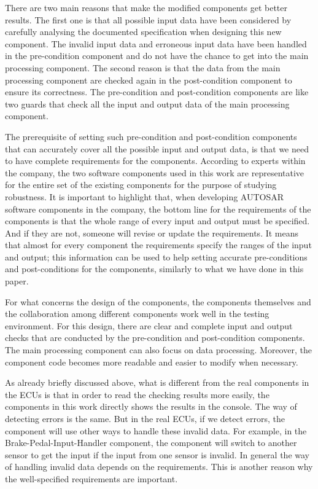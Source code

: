 There are two main reasons that make the modified components get better results. The first one is that all possible input data have been considered by carefully analysing the documented specification when designing this new component. The invalid input data and erroneous input data have been handled in the pre-condition component and do not have the chance to get into the main processing component. The second reason is that the data from the main processing component are checked again in the post-condition component to ensure its correctness. The pre-condition and post-condition components are like two guards that check all the input and output data of the main processing component. 

The prerequisite of setting such pre-condition and post-condition components that can accurately cover all the possible input and output data, is that we need to have complete requirements for the components. 
According to experts within the company, %
the two software components used in this work are representative for the entire set of the existing components for the purpose of studying robustness. It is important to highlight that, when developing AUTOSAR software components in the company, the bottom line for the requirements of the components is that the whole range of every input and output must be specified. And if they are not, someone will revise or update the requirements. It means that almost for every component the requirements specify the ranges of the input and output; this information can be used to help setting accurate pre-conditions and post-conditions for the components, similarly to what we have done in this paper.

For what concerns the design of the components, the components themselves and the collaboration among different components work well in the testing environment. For this design, there are clear and complete input and output checks that are conducted by the pre-condition and post-condition components. The main processing component can also focus on data processing. Moreover, the component code  becomes more readable and easier to modify when necessary. 

As already briefly discussed above, what is different from the real components in the ECUs is that in order to read the checking results more easily, the components in this work directly shows the results in the console. The way of detecting errors is the same. But in the real ECUs, if we detect errors, the component will use other ways to handle these invalid data. For example, in the Brake-Pedal-Input-Handler component, the component will switch to another sensor to get the input if the input from one sensor is invalid. In general the way of handling %
invalid data depends on the requirements. This is another reason why the well-specified requirements are important. 

